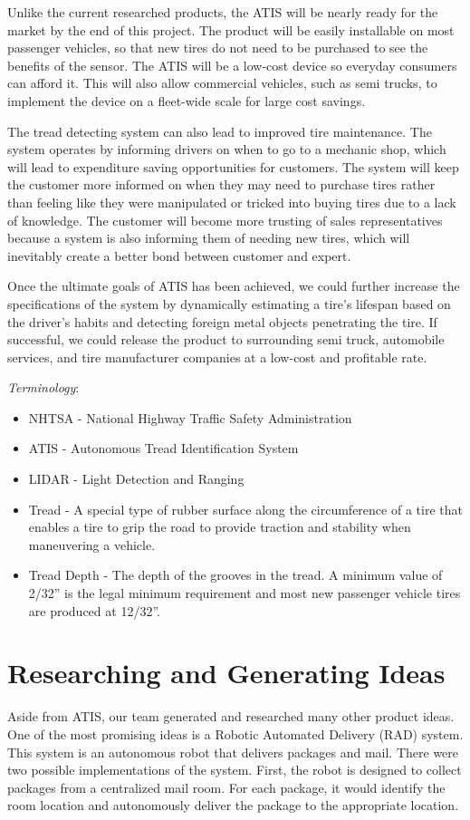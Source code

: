 \documentclass[11pt]{IEEEtran}
\begin{document}
			Unlike the current researched products, the ATIS will be nearly ready for the market by the end of this project. The product will be easily installable on most passenger vehicles, so that new tires do not need to be purchased to see the benefits of the sensor. The ATIS will be a low-cost device so everyday consumers can afford it. This will also allow commercial vehicles, such as semi trucks, to implement the device on a fleet-wide scale for large cost savings. 

			The tread detecting system can also lead to improved tire maintenance. The system operates by informing drivers on when to go to a mechanic shop, which will lead to expenditure saving opportunities for customers. The system will keep the customer more informed on when they may need to purchase tires rather than feeling like they were manipulated or tricked into buying tires due to a lack of knowledge. The customer will become more trusting of sales representatives because a system is also informing them of needing new tires, which will inevitably create a better bond between customer and expert. 

			Once the ultimate goals of ATIS has been achieved, we could further increase the specifications of the system by dynamically estimating a tire’s lifespan based on the driver’s habits and detecting foreign metal objects penetrating the tire. If successful, we could release the product to surrounding semi truck, automobile services, and tire manufacturer companies at a low-cost and profitable rate.

		\textit{Terminology}:
		\begin{itemize}
			\item NHTSA - National Highway Traffic Safety Administration
			\item ATIS - Autonomous Tread Identification System
			\item LIDAR - Light Detection and Ranging 
			\item Tread - A special type of rubber surface along the circumference of a tire that enables a tire to grip the road to provide traction and stability when maneuvering a vehicle.
			\item Tread Depth - The depth of the grooves in the tread. A minimum value of 2/32'' is the legal minimum requirement and most new passenger vehicle tires are produced at 12/32''.
		\end{itemize}

	\section{Researching and Generating Ideas}
		Aside from ATIS, our team generated and researched many other product ideas. One of the most promising ideas is a Robotic Automated Delivery (RAD) system. This system is an autonomous robot that delivers packages and mail. There were two possible implementations of the system. First, the robot is designed to collect packages from a centralized mail room. For each package, it would identify the room location and autonomously deliver the package to the appropriate location.
\end{document}
